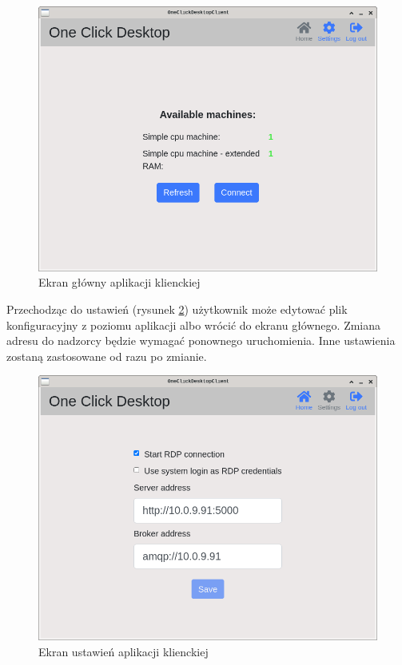 \documentclass[../opis-rozwiazania.tex]{subfiles}
\begin{document}
\begin{figure}[H]
	\centering
	\includegraphics[width=\textwidth]{resources/client_home.png}
	\caption{Ekran główny aplikacji klienckiej}
	\label{figure:system_interaction.client.home}
\end{figure}

Przechodząc do ustawień (rysunek \ref{figure:system_interaction.client.settings}) użytkownik może edytować plik konfiguracyjny z poziomu aplikacji albo wrócić do ekranu głównego.
Zmiana adresu do nadzorcy będzie wymagać ponownego uruchomienia.
Inne ustawienia zostaną zastosowane od razu po zmianie.

\begin{figure}[H]
	\centering
	\includegraphics[width=\textwidth]{resources/client_settings.png}
	\caption{Ekran ustawień aplikacji klienckiej}
	\label{figure:system_interaction.client.settings}
\end{figure}
\end{document}
